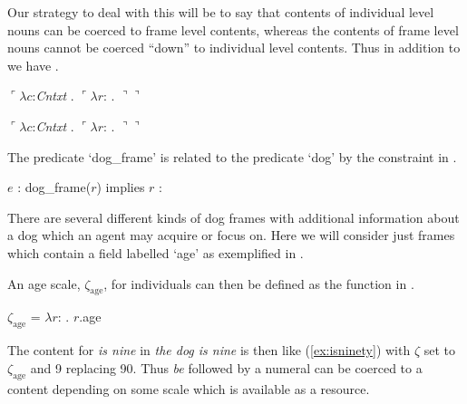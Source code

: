 Our strategy to deal with this will be to say that contents of individual level
nouns can be coerced to frame level contents, whereas the contents of
frame level nouns cannot be coerced ``down'' to individual level
contents.  Thus in addition to  we have .
\begin{ex} 
\begin{subex} 
 
\item $\ulcorner\lambda c$:\textit{Cntxt} . $\ulcorner\lambda
  r$: . $\urcorner\urcorner$  
 
\item  $\ulcorner\lambda c$:\textit{Cntxt} . $\ulcorner\lambda
  r$: . $\urcorner\urcorner$ 
 
\end{subex} 
 \label{ex:dog-dogframe}  
\end{ex} 
The predicate `dog\_frame' is related to the predicate `dog' by the
constraint in \nexteg{}.
\begin{ex} 
$e$ : dog\_frame($r$) implies $r$ :  
\end{ex} 
There are several different kinds of dog frames
with additional information about a dog which an agent may acquire or
focus on.  Here we will consider just
frames which contain a field labelled `age' as exemplified in \nexteg{}.
\begin{ex} 
                     
\label{ex:dogframe}
\end{ex} 
An age scale, $\zeta_{\mathrm{age}}$, for individuals can then be
defined as the function in \nexteg{}.
\begin{ex} 
$\zeta_{\mathrm{age}}$ = 
$\lambda r$:
                       . $r$.age
  
\label{ex:agescale}
\end{ex} 
The content for \textit{is nine} in \textit{the dog is nine} is
then like (\ref{ex:isninety}) with $\zeta$ set to
$\zeta_{\mathrm{age}}$ and 9 replacing 90. Thus \textit{be} followed
by a numeral can be coerced to a content depending on some scale which
is available as a resource.  

